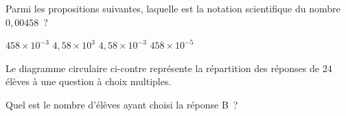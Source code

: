 \documentclass[A5]{dnbqcm}
\begin{document}
    \medskip\qcmquestion
    Parmi les propositions suivantes, laquelle est la notation
    scientifique du nombre $0,00458$~?%
    \begin{qcmquestions}
        \qcmitem $458\times10^{-3}$ \hskip20pt
        \qcmitem $4,58\times10^{3}$ \hskip20pt
        \qcmitem $4,58\times10^{-3}$ \hskip20pt
        \qcmitem $458\times10^{-5}$ \hskip20pt
    \end{qcmquestions}
    \newpage
    \medskip\qcmquestion
    \begin{minipage}[c]{.55\linewidth}
        Le diagramme circulaire ci-contre représente la répartition
        des réponses de 24 élèves à une question à choix multiples.
        \par\smallskip\noindent
        Quel est le nombre d'élèves ayant choisi la réponse B~?
    \end{minipage}\hskip30pt
    \begin{minipage}[c]{.4\linewidth}
    \end{minipage}
\end{document}
